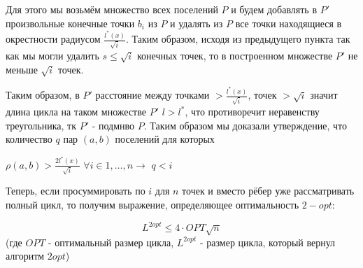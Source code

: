 \documentclass[a4paper,12pt]{article}
\begin{document}
Для этого мы возьмём множество всех поселений $P$ и будем добавлять в $P'$ произвольные конечные точки $b_i$ из $P$ и удалять из $P$ все точки находящиеся в окрестности радиусом $\frac{ l^*(x)}{\sqrt{i}}$. Таким образом, исходя из предыдущего пункта так как мы могли удалить $s\leq\sqrt{i}$ конечных точек, то в построенном множестве $P'$ не меньше $\sqrt{i}$ точек.

Таким образом, в $P'$ расстояние между точками $>\frac{ l^*(x)}{\sqrt{i}}$, точек $>\sqrt{i}$ значит длина цикла на таком множестве $P'$ $l>l^*$, что противоречит неравенству треугольника, тк $P'$ - подмнво $P$. Таким образом мы доказали утверждение, что количество $q$ пар $(a,b)$ поселений для которых 

$\rho(a,b)>\frac{2 l^*(x)}{\sqrt{i}}$ $\forall i \in 1, \dots, n \rightarrow$ $q<i$

Теперь, если просуммировать по $i$ для $n$ точек и вместо рёбер уже рассматривать полный цикл, то получим выражение, определяющее оптимальность $2-opt$:

$$L^{2opt}\leq 4\cdot OPT\sqrt{n}$$(где $OPT$ - оптимальный размер цикла, $L^{2opt}$ - размер цикла, который вернул алгоритм $2opt$)
\end{document}
